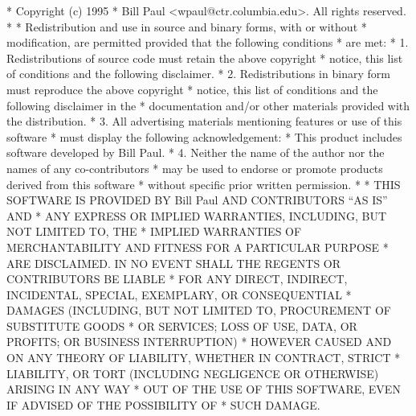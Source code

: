 \begin{copyrightEnv}
 * Copyright (c) 1995
 *      Bill Paul <wpaul@ctr.columbia.edu>.  All rights reserved.
 *
 * Redistribution and use in source and binary forms, with or without
 * modification, are permitted provided that the following conditions
 * are met:
 * 1. Redistributions of source code must retain the above copyright
 *    notice, this list of conditions and the following disclaimer.
 * 2. Redistributions in binary form must reproduce the above copyright
 *    notice, this list of conditions and the following disclaimer in the
 *    documentation and/or other materials provided with the distribution.
 * 3. All advertising materials mentioning features or use of this software
 *    must display the following acknowledgement:
 *      This product includes software developed by Bill Paul.
 * 4. Neither the name of the author nor the names of any co-contributors
 *    may be used to endorse or promote products derived from this software
 *    without specific prior written permission.
 *
 * THIS SOFTWARE IS PROVIDED BY Bill Paul AND CONTRIBUTORS ``AS IS'' AND
 * ANY EXPRESS OR IMPLIED WARRANTIES, INCLUDING, BUT NOT LIMITED TO, THE
 * IMPLIED WARRANTIES OF MERCHANTABILITY AND FITNESS FOR A PARTICULAR PURPOSE
 * ARE DISCLAIMED.  IN NO EVENT SHALL THE REGENTS OR CONTRIBUTORS BE LIABLE
 * FOR ANY DIRECT, INDIRECT, INCIDENTAL, SPECIAL, EXEMPLARY, OR CONSEQUENTIAL
 * DAMAGES (INCLUDING, BUT NOT LIMITED TO, PROCUREMENT OF SUBSTITUTE GOODS
 * OR SERVICES; LOSS OF USE, DATA, OR PROFITS; OR BUSINESS INTERRUPTION)
 * HOWEVER CAUSED AND ON ANY THEORY OF LIABILITY, WHETHER IN CONTRACT, STRICT
 * LIABILITY, OR TORT (INCLUDING NEGLIGENCE OR OTHERWISE) ARISING IN ANY WAY
 * OUT OF THE USE OF THIS SOFTWARE, EVEN IF ADVISED OF THE POSSIBILITY OF
 * SUCH DAMAGE.
\end{copyrightEnv}

